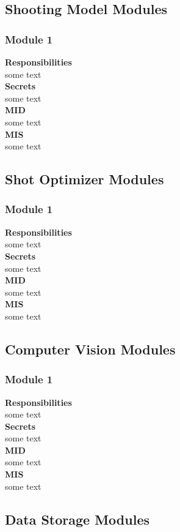 \documentclass[11pt]{article}
\begin{document}
\subsection{Shooting Model Modules}
\subsubsection*{Module 1}
\textbf{Responsibilities} \\
some text \\
\textbf{Secrets} \\ 
some text \\ 
\textbf{MID} \\
some text \\
\textbf{MIS} \\
some text \\
\subsection{Shot Optimizer Modules}
\subsubsection*{Module 1}
\textbf{Responsibilities} \\
some text \\
\textbf{Secrets} \\ 
some text \\ 
\textbf{MID} \\
some text \\
\textbf{MIS} \\
some text \\
\subsection{Computer Vision Modules}
\subsubsection*{Module 1}
\textbf{Responsibilities} \\
some text \\
\textbf{Secrets} \\ 
some text \\ 
\textbf{MID} \\
some text \\
\textbf{MIS} \\
some text \\
\subsection{Data Storage Modules}
\end{document}
